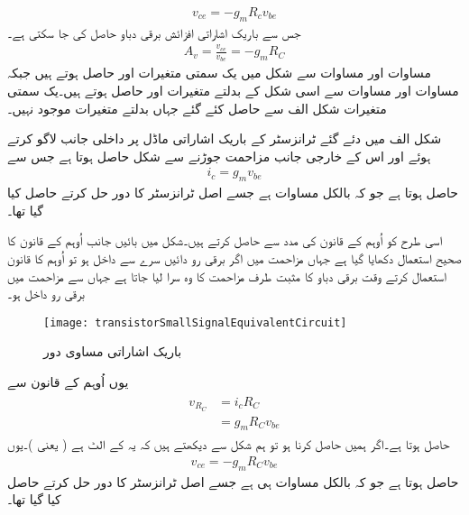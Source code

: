 \begin{align} \label{مساوات_ٹرانزسٹر_اشارہ_موجود_لہذا_بدلتا_دباو}
v_{ce}=- g_m R_c v_{be}
\end{align}
جس سے باریک اشاراتی افزائش برقی دباو  حاصل کی جا سکتی ہے۔
\begin{align}
A_v = \frac{v_{ce}}{v_{be}}=-g_m R_C
\end{align}
	مساوات   اور مساوات  سے شکل   میں یک سمتی متغیرات  اور  حاصل ہوتے ہیں جبکہ مساوات   اور مساوات   سے اسی شکل کے بدلتے متغیرات  اور  حاصل ہوتے ہیں۔یک سمتی متغیرات شکل  الف   سے حاصل کئے گئے جہاں بدلتے متغیرات موجود نہیں۔

شکل  الف میں دئے گئے ٹرانزسٹر کے باریک اشاراتی ماڈل پر داخلی جانب  لاگو کرتے ہوئے اور اس کے خارجی جانب مزاحمت  جوڑنے سے شکل   حاصل ہوتا ہے جس سے
\begin{align}
i_c = g_m v_{be}
\end{align}
حاصل ہوتا ہے جو کہ بالکل مساوات   ہے جسے اصل ٹرانزسٹر کا دور حل کرتے حاصل کیا گیا تھا۔

اسی طرح  کو  اُوہم کے قانون کی مدد سے حاصل کرتے ہیں۔شکل میں بائیں جانب  اُوہم کے قانون کا صحیح استعمال دکھایا گیا ہے جہاں مزاحمت   میں اگر برقی رو  دائیں سرے سے داخل ہو تو  اُوہم کا قانون استعمال کرتے وقت برقی دباو  کا مثبت طرف مزاحمت کا وہ سرا لیا جاتا ہے جہاں سے مزاحمت میں برقی رو داخل ہو۔
\begin{figure}
\centering
\texttt{[image: transistorSmallSignalEquivalentCircuit]}
\caption{باریک اشاراتی مساوی دور}
\label{شکل_باریک_اشاراتی_مساوی_دور}
\end{figure}
یوں  اُوہم کے قانون سے
\begin{gather}
\begin{aligned}
v_{R_C}&=i_c R_C\\
&=g_m R_C v_{be}
\end{aligned}
\end{gather}
حاصل ہوتا ہے۔اگر ہمیں  حاصل کرنا ہو تو ہم شکل سے دیکھتے ہیں کہ یہ  کے الٹ ہے ( یعنی )۔یوں
\begin{align}
v_{ce}=-g_m R_C v_{be}
\end{align}
حاصل ہوتا ہے جو کہ بالکل مساوات  ہی ہے جسے اصل ٹرانزسٹر کا دور حل کرتے حاصل کیا گیا تھا۔

